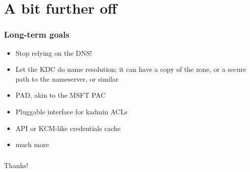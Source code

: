 \documentclass{beamer}
\begin{document}
\section{A bit further off}

\begin{frame}
\frametitle{Long-term goals}
\begin{itemize}
\item{Stop relying on the DNS!}
\item{Let the KDC do name resolution; it can have a copy of the zone, or a
	secure path to the nameserver, or similar}
\item{PAD, akin to the MSFT PAC}
\item{Pluggable interface for kadmin ACLs}
\item{API or KCM-like credentials cache}
\item{much more}
\end{itemize}
\end{frame}

\begin{frame}
\frametitle{}
\Large{Thanks!}
\end{frame}
\end{document}
